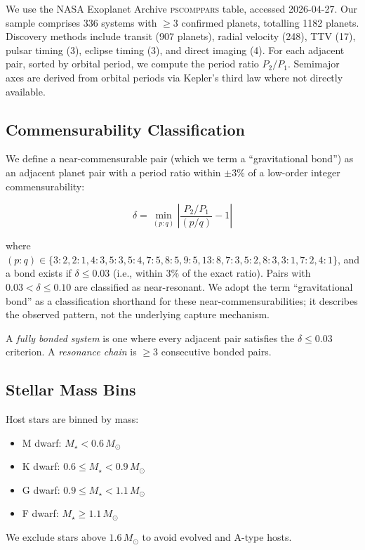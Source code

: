 \documentclass[twocolumn,usenatbib]{mnras}
\begin{document}
We use the NASA Exoplanet Archive \textsc{pscomppars} table, accessed
2026-04-27. Our sample comprises 336 systems with $\geq 3$ confirmed planets,
totalling 1182 planets. Discovery methods include transit (907 planets),
radial velocity (248), TTV (17), pulsar timing (3), eclipse timing (3), and
direct imaging (4). For each adjacent pair, sorted by orbital period, we
compute the period ratio $P_2/P_1$. Semimajor axes are derived from orbital
periods via Kepler's third law where not directly available.

\subsection{Commensurability Classification}

We define a near-commensurable pair (which we term a
``gravitational bond'') as an adjacent planet pair with a period ratio within
$\pm 3\%$ of a low-order integer commensurability:

\begin{equation}
\delta = \min_{(p:q)} \left| \frac{P_2/P_1}{(p/q)} - 1 \right|
\label{eq:delta}
\end{equation}

where $(p:q) \in \{3:2, 2:1, 4:3, 5:3, 5:4, 7:5, 8:5, 9:5, 13:8, 7:3, 5:2, 8:3,
3:1, 7:2, 4:1\}$, and a bond exists if $\delta \leq 0.03$ (i.e., within 3\%
of the exact ratio). Pairs with $0.03 < \delta \leq 0.10$ are classified as
near-resonant. We adopt the term ``gravitational bond'' as a classification
shorthand for these near-commensurabilities; it describes the observed pattern,
not the underlying capture mechanism.

A \textit{fully bonded system} is one where every adjacent pair satisfies the
$\delta \leq 0.03$ criterion. A \textit{resonance chain} is $\geq 3$
consecutive bonded pairs.

\subsection{Stellar Mass Bins}

Host stars are binned by mass:
\begin{itemize}
  \item M dwarf: $M_\star < 0.6\,M_\odot$
  \item K dwarf: $0.6 \leq M_\star < 0.9\,M_\odot$
  \item G dwarf: $0.9 \leq M_\star < 1.1\,M_\odot$
  \item F dwarf: $M_\star \geq 1.1\,M_\odot$
\end{itemize}
We exclude stars above $1.6\,M_\odot$ to avoid evolved and A-type hosts.
\end{document}
